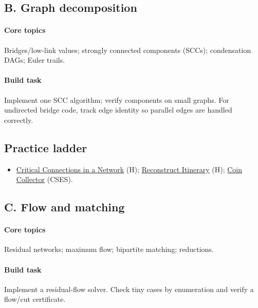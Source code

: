 \documentclass[11pt,letterpaper]{article}
\begin{document}
\subsection*{B. Graph decomposition}

\paragraph*{Core topics}

Bridges/low-link values; strongly connected components (SCCs); condensation DAGs; Euler trails.

\paragraph*{Build task}

Implement one SCC algorithm; verify components on small graphs. For undirected bridge code, track edge identity so parallel edges are handled correctly.

\subsection*{Practice ladder}

\begin{itemize}

\item \href{https://leetcode.com/problems/critical-connections-in-a-network/}{Critical Connections in a Network} (H); \href{https://leetcode.com/problems/reconstruct-itinerary/}{Reconstruct Itinerary} (H); \href{https://cses.fi/problemset/task/1686}{Coin Collector} (CSES).

\end{itemize}

\subsection*{C. Flow and matching}

\paragraph*{Core topics}

Residual networks; maximum flow; bipartite matching; reductions.

\paragraph*{Build task}

Implement a residual-flow solver. Check tiny cases by enumeration and verify a flow/cut certificate.
\end{document}
